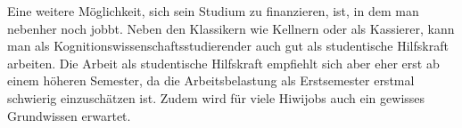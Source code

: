 Eine weitere Möglichkeit, sich sein Studium zu finanzieren, ist, in dem man nebenher noch jobbt. Neben den Klassikern wie Kellnern oder als Kassierer, kann man als Kognitionswissenschaftsstudierender auch gut als studentische Hilfskraft arbeiten.
Die Arbeit als studentische Hilfskraft empfiehlt sich aber eher erst ab einem höheren Semester, da die Arbeitsbelastung als Erstsemester erstmal schwierig einzuschätzen ist. Zudem wird für viele Hiwijobs auch ein gewisses Grundwissen erwartet.